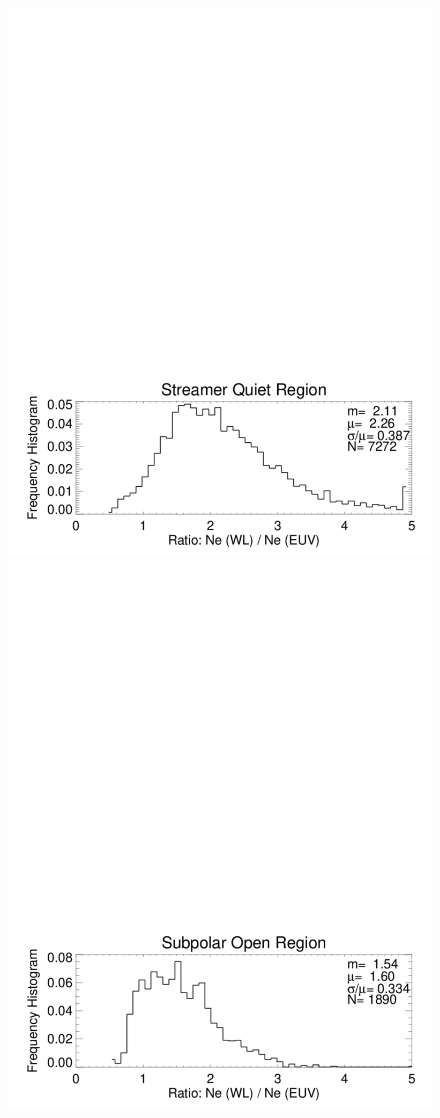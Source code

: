 \documentclass[baaa]{baaa}
\begin{document}
\begin{figure}[!h]
  \centering
  \includegraphics[width=\columnwidth]{comparison_quiet_region_009_bloqueados.pdf}
  \includegraphics[width=\columnwidth]{comparison_open_region_009_bloqueados.pdf}\\

\end{figure}
\end{document}
